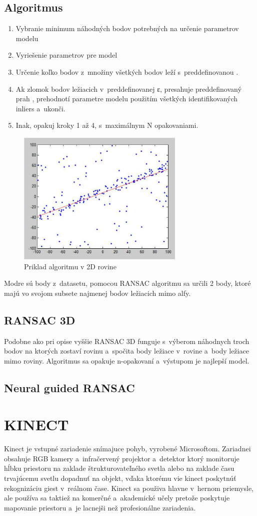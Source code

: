 \subsection{Algoritmus}
\begin{enumerate}
    \item Vybranie minimum náhodných bodov potrebných na určenie parametrov modelu
    \item Vyriešenie parametrov pre model
    \item Určenie koľko bodov z množiny všetkých bodov leží s preddefinovanou \epsilon.
    \item Ak zlomok bodov ležiacich v preddefinovanej ε, presahuje preddefinovaný prah \tau, prehodnotí parametre modelu použitím všetkých identifikovaných inliers a ukonči.
    \item Inak, opakuj kroky 1 až 4, s maximálnym N opakovaniami.
\end{enumerate}
\begin{figure}[!htbp]
  \centering
  \includegraphics[width=8cm]{img/ransac2D.png}
  \caption{Priklad algoritmu v 2D rovine}
  \label{vzhladobr}
\end{figure}
Modre sú body z datasetu, pomocou RANSAC algoritmu sa určili 2 body, ktoré majú vo svojom subsete najmenej bodov ležiacich mimo alfy.
\subsection{RANSAC 3D}
Podobne ako pri opise vyššie RANSAC 3D funguje s výberom náhodnych troch bodov na ktorých zostaví rovinu a spočita body ležiace v rovine a body ležiace mimo roviny. Algoritmus sa opakuje n-opakovaní a výstupom je najlepší model.
\subsection{Neural guided RANSAC}
\section{KINECT}
Kinect je vstupné zariadenie snímajuce pohyb, vyrobené Microsoftom. Zariadnei obsahuje RGB kamery a infračervený projektor a detektor ktorý monitoruje hĺbku priestoru na zaklade štrukturovateľného svetla alebo na zaklade času trvajúcemu svetlu dopadnuť na objekt, vďaka ktorému vie kinect poskytnúť rekognizáciu giest v reálnom čase. Kinect sa použiva hlavne v hernom priemysle, ale používa sa taktiež na komerčné a akademické učely pretože poskytuje mapovanie priestoru a je lacnejši než profesionálne zariadenia.  
